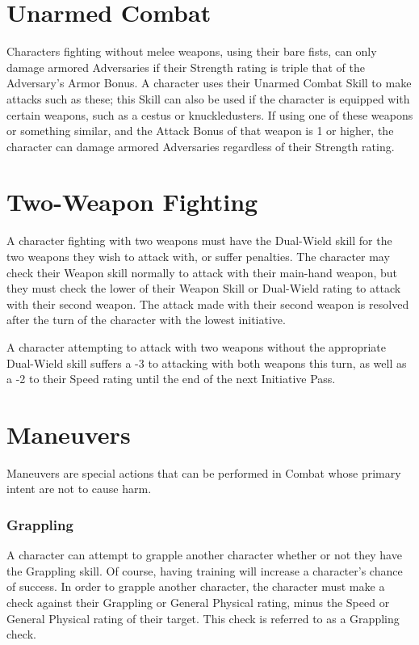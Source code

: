 \documentclass[oneside]{book}
\begin{document}
\begin{multicols}{2}
\section{Unarmed Combat}
Characters fighting without melee weapons, using their bare fists, can only damage armored Adversaries if their Strength rating is triple that of the Adversary's Armor Bonus. A character uses their Unarmed Combat Skill to make attacks such as these; this Skill can also be used if the character is equipped with certain weapons, such as a cestus or knuckledusters. If using one of these weapons or something similar, and the Attack Bonus of that weapon is 1 or higher, the character can damage armored Adversaries regardless of their Strength rating.  

\section{Two-Weapon Fighting}
A character fighting with two weapons must have the Dual-Wield skill for the two weapons they wish to attack with, or suffer penalties. The character may check their Weapon skill normally to attack with their main-hand weapon, but they must check the lower of their Weapon Skill or Dual-Wield rating to attack with their second weapon. The attack made with their second weapon is resolved after the turn of the character with the lowest initiative. 

A character attempting to attack with two weapons without the appropriate Dual-Wield skill suffers a -3 to attacking with both weapons this turn, as well as a -2 to their Speed rating until the end of the next Initiative Pass. 

\section{Maneuvers}
Maneuvers are special actions that can be performed in Combat whose primary intent are not to cause harm. 

\subsubsection{Grappling}
A character can attempt to grapple another character whether or not they have the Grappling skill. Of course, having training will increase a character's chance of success. In order to grapple another character, the character must make a check against their Grappling or General Physical rating, minus the Speed or General Physical rating of their target. This check is referred to as a Grappling check. 


\end{multicols}
\end{document}
